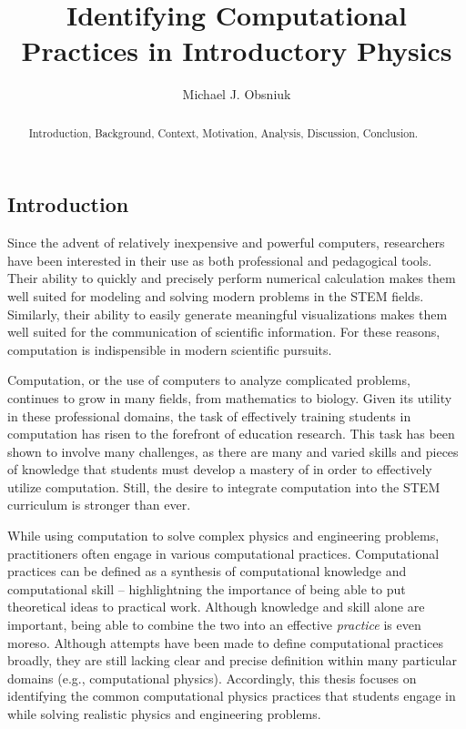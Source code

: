 \documentclass{msuphddissertation}
\author{Michael J. Obsniuk}
\title{Identifying Computational Practices in Introductory Physics}
\begin{document}
\maketitlepage

\begin{abstract}
Introduction, Background, Context, Motivation, Analysis, Discussion, Conclusion.
\end{abstract}

\TOC
\LOT
\LOF

\newpage
{}
\begin{doublespace}

%
%
%
%
%
%
%
%
%
%
%
%
%
%
%
%

\chapter{Introduction}\label{CH1:Introduction}

Since the advent of relatively inexpensive and powerful computers, researchers have been interested in their use as both professional and pedagogical tools.  Their ability to quickly and precisely perform numerical calculation makes them well suited for modeling and solving modern problems in the STEM fields.  Similarly, their ability to easily generate meaningful visualizations makes them well suited for the communication of scientific information.  For these reasons, computation is indispensible in modern scientific pursuits.

Computation, or the use of computers to analyze complicated problems, continues to grow in many fields, from mathematics to biology.  Given its utility in these professional domains, the task of effectively training students in computation has risen to the forefront of education research.  This task has been shown to involve many challenges, as there are many and varied skills and pieces of knowledge that students must develop a mastery of in order to effectively utilize computation.  Still, the desire to integrate computation into the STEM curriculum is stronger than ever.

While using computation to solve complex physics and engineering problems, practitioners often engage in various computational practices.  Computational practices can be defined as a synthesis of computational knowledge and computational skill -- highlightning the importance of being able to put theoretical ideas to practical work.  Although knowledge and skill alone are important, being able to combine the two into an effective \textit{practice} is even moreso.  Although attempts have been made to define computational practices broadly, they are still lacking clear and precise definition within many particular domains (e.g., computational physics). Accordingly, this thesis focuses on identifying the common computational physics practices that students engage in while solving realistic physics and engineering problems.


\end{doublespace}
\end{document}
